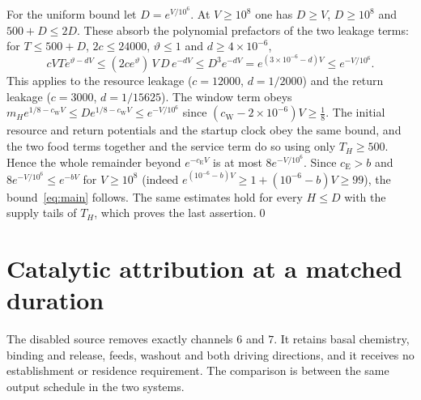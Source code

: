 \documentclass[11pt,a4paper]{article}
\theoremstyle{plain}
\theoremstyle{definition}
\theoremstyle{remark}
\newcommand{\cE}{c_{\mathrm E}}
\newcommand{\cW}{c_{\mathrm W}}
\begin{document}
For the uniform bound let $D=e^{V/10^6}$. At $V\ge10^8$ one has $D\ge V$, $D\ge10^8$ and $500+D\le2D$. These absorb the polynomial prefactors of the two leakage terms: for $T\le500+D$, $2c\le24000$, $\vartheta\le1$ and $d\ge4\times10^{-6}$,
\[
 cVTe^{\vartheta-dV}\le(2ce^{\vartheta})\,V\,D\,e^{-dV}\le D^3e^{-dV}=e^{(3\times10^{-6}-d)V}\le e^{-V/10^6}.
\]
This applies to the resource leakage ($c=12000$, $d=1/2000$) and the return leakage ($c=3000$, $d=1/15625$). The window term obeys $m_He^{1/8-\cW V}\le De^{1/8-\cW V}\le e^{-V/10^6}$ since $(\cW-2\times10^{-6})V\ge\frac18$. The initial resource and return potentials and the startup clock obey the same bound, and the two food terms together and the service term do so using only $T_H\ge500$. Hence the whole remainder beyond $e^{-\cE V}$ is at most $8e^{-V/10^6}$. Since $\cE>b$ and $8e^{-V/10^6}\le e^{-bV}$ for $V\ge10^8$ (indeed $e^{(10^{-6}-b)V}\ge1+(10^{-6}-b)V\ge99$), the bound~\eqref{eq:main} follows. The same estimates hold for every $H\le D$ with the supply tails of $T_H$, which proves the last assertion.\qed

\section{Catalytic attribution at a matched duration}\label{sec:disabled}

The disabled source removes exactly channels $6$ and $7$. It retains basal chemistry, binding and release, feeds, washout and both driving directions, and it receives no establishment or residence requirement. The comparison is between the same output schedule in the two systems.
\end{document}
